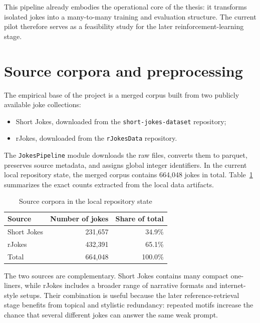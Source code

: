 \documentclass[14pt,a4paper]{extreport}
\begin{document}
This pipeline already embodies the operational core of the thesis: it transforms isolated jokes into a many-to-many training and evaluation structure. The current pilot therefore serves as a feasibility study for the later reinforcement-learning stage.

\section{Source corpora and preprocessing}

The empirical base of the project is a merged corpus built from two publicly available joke collections:
\begin{itemize}
  \item Short Jokes, downloaded from the \texttt{short-jokes-dataset} repository;
  \item rJokes, downloaded from the \texttt{rJokesData} repository.
\end{itemize}

The \texttt{JokesPipeline} module downloads the raw files, converts them to parquet, preserves source metadata, and assigns global integer identifiers. In the current local repository state, the merged corpus contains 664{,}048 jokes in total. Table~\ref{tab:corpora} summarizes the exact counts extracted from the local data artifacts.

\begin{table}[ht]
  \centering
  \caption{Source corpora in the local repository state}
  \label{tab:corpora}
  \begin{tabular}{lrr}
    \toprule
    Source      & Number of jokes & Share of total \\
    \midrule
    Short Jokes & 231{,}657       & 34.9\%         \\
    rJokes      & 432{,}391       & 65.1\%         \\
    \midrule
    Total       & 664{,}048       & 100.0\%        \\
    \bottomrule
  \end{tabular}
\end{table}

The two sources are complementary. Short Jokes contains many compact one-liners, while rJokes includes a broader range of narrative formats and internet-style setups. Their combination is useful because the later reference-retrieval stage benefits from topical and stylistic redundancy: repeated motifs increase the chance that several different jokes can answer the same weak prompt.
\end{document}
